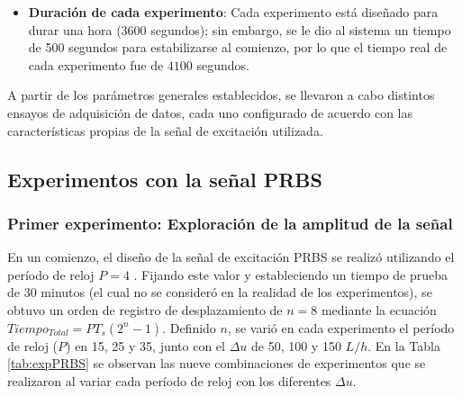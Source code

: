 \documentclass[11pt]{report}
\begin{document}
\begin{itemize}
    \item \textbf{Duración de cada experimento}: Cada experimento está diseñado para durar una hora (3600 segundos); sin embargo, se le dio al sistema un tiempo de 500 segundos para estabilizarse al comienzo, por lo que el tiempo real de cada experimento fue de $4100$ segundos.
    

\end{itemize}



A partir de los parámetros generales establecidos, se llevaron a cabo distintos ensayos de adquisición de datos, cada uno configurado de acuerdo con las características propias de la señal de excitación utilizada.
\subsection{Experimentos con la señal PRBS} 


\subsubsection{Primer experimento: Exploración de la amplitud de la señal}

En un comienzo, el diseño de la señal de excitación PRBS se realizó utilizando el período de reloj $P=4$ \cite{ljung1999system}. Fijando este valor y estableciendo un tiempo de prueba de 30 minutos (el cual no se consideró en la realidad de los experimentos), se obtuvo un orden de registro de desplazamiento de $n=8$ mediante la ecuación $Tiempo_{Total}=PT_s(2^{n}-1)$.
Definido $n$, se varió en cada experimento el período de reloj ($P$) en 15, 25 y 35, junto con el $\Delta u$  de 50, 100 y 150 $L/h$. En la Tabla \ref{tab:expPRBS} se observan las nueve combinaciones de experimentos que se realizaron al variar cada período de reloj con los diferentes $\Delta u$.
\end{document}
